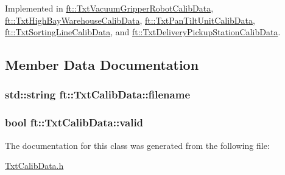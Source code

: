 Implemented in \hyperlink{classft_1_1_txt_vacuum_gripper_robot_calib_data_a620eb825a421524b94c78fb1f0db4a6c}{ft\+::\+Txt\+Vacuum\+Gripper\+Robot\+Calib\+Data}, \hyperlink{classft_1_1_txt_high_bay_warehouse_calib_data_ac8d87668f8d0347714f6545954df3573}{ft\+::\+Txt\+High\+Bay\+Warehouse\+Calib\+Data}, \hyperlink{classft_1_1_txt_pan_tilt_unit_calib_data_aa18d6ee3e2f9971e86baf69fa90d14cf}{ft\+::\+Txt\+Pan\+Tilt\+Unit\+Calib\+Data}, \hyperlink{classft_1_1_txt_sorting_line_calib_data_a98a160d82617960198b4b58da594d894}{ft\+::\+Txt\+Sorting\+Line\+Calib\+Data}, and \hyperlink{classft_1_1_txt_delivery_pickup_station_calib_data_a1cf9b3eb2a58d76ef84de23021c4e3bb}{ft\+::\+Txt\+Delivery\+Pickup\+Station\+Calib\+Data}.



\subsection{Member Data Documentation}
\subsubsection[{\texorpdfstring{filename}{filename}}]{\setlength{\rightskip}{0pt plus 5cm}std\+::string ft\+::\+Txt\+Calib\+Data\+::filename\hspace{0.3cm}{\ttfamily [protected]}}\hypertarget{classft_1_1_txt_calib_data_a4416924019587d7cb019b01652a20aab}{}\label{classft_1_1_txt_calib_data_a4416924019587d7cb019b01652a20aab}
\subsubsection[{\texorpdfstring{valid}{valid}}]{\setlength{\rightskip}{0pt plus 5cm}bool ft\+::\+Txt\+Calib\+Data\+::valid\hspace{0.3cm}{\ttfamily [protected]}}\hypertarget{classft_1_1_txt_calib_data_a0daecf43952003ea82b890dd266ae2c9}{}\label{classft_1_1_txt_calib_data_a0daecf43952003ea82b890dd266ae2c9}


The documentation for this class was generated from the following file\+:\begin{DoxyCompactItemize}
\item 
\hyperlink{_txt_calib_data_8h}{Txt\+Calib\+Data.\+h}\end{DoxyCompactItemize}
